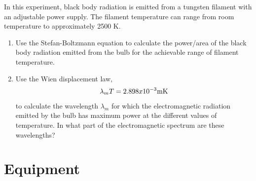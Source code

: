 \documentclass{article}
\begin{document}
In this experiment, black body radiation is emitted from a tungsten filament with an adjustable power supply.    The filament temperature can range from room temperature to approximately 2500 K.

\begin{enumerate}
\item Use the Stefan-Boltzmann equation to calculate the power/area of the
black body radiation emitted from the bulb for the achievable range of filament temperature.


\item Use the Wien displacement law,
\begin{equation}
\lambda_m T = 2.898 x 10^{-3}  {\rm m} {\rm K}
\end{equation}
to calculate the wavelength $\lambda_m$ for which the
electromagnetic radiation emitted by the bulb has maximum power at the different values of temperature.  In
what part of the electromagnetic spectrum are these wavelengths?
\end{enumerate}


\section{Equipment}
\end{document}
